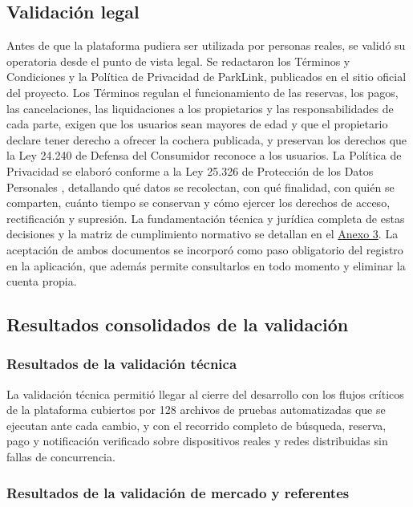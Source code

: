 \subsection{Validación legal}\label{sec:validacion_legal}

Antes de que la plataforma pudiera ser utilizada por personas reales, se validó su operatoria desde el punto de vista legal. Se redactaron los Términos y Condiciones y la Política de Privacidad de ParkLink, publicados en el sitio oficial del proyecto. Los Términos regulan el funcionamiento de las reservas, los pagos, las cancelaciones, las liquidaciones a los propietarios y las responsabilidades de cada parte, exigen que los usuarios sean mayores de edad y que el propietario declare tener derecho a ofrecer la cochera publicada, y preservan los derechos que la Ley 24.240 de Defensa del Consumidor \autocite{ley24240} reconoce a los usuarios. La Política de Privacidad se elaboró conforme a la Ley 25.326 de Protección de los Datos Personales \autocite{ley25326}, detallando qué datos se recolectan, con qué finalidad, con quién se comparten, cuánto tiempo se conservan y cómo ejercer los derechos de acceso, rectificación y supresión. La fundamentación técnica y jurídica completa de estas decisiones y la matriz de cumplimiento normativo se detallan en el \hyperref[anexo:legal]{Anexo 3}. La aceptación de ambos documentos se incorporó como paso obligatorio del registro en la aplicación, que además permite consultarlos en todo momento y eliminar la cuenta propia.

\subsection{Resultados consolidados de la validación}

\subsubsection{Resultados de la validación técnica}

La validación técnica permitió llegar al cierre del desarrollo con los flujos críticos de la plataforma cubiertos por 128 archivos de pruebas automatizadas que se ejecutan ante cada cambio, y con el recorrido completo de búsqueda, reserva, pago y notificación verificado sobre dispositivos reales y redes distribuidas sin fallas de concurrencia.

\subsubsection{Resultados de la validación de mercado y referentes}

